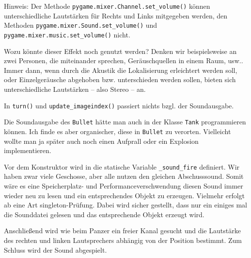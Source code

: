 Hinweis: Der Methode \texttt{pygame.mixer.Channel\-.set\-\_vol\-ume()} können unterschiedliche Lautstärken für Rechts und Links mitgegeben werden, den Methoden \texttt{pygame.mix\-er\-.Sound\-.set\-\_vol\-ume()} und \texttt{pygame.mixer.music\-.set\-\_vol\-ume()} nicht.


Wozu könnte dieser Effekt noch genutzt werden? Denken wir beispielsweise an zwei Personen, die miteinander sprechen, Geräuschquellen in einem Raum, usw.. Immer dann, wenn durch die Akustik die Lokalisierung erleichtert werden soll, oder Einzelgeräusche abgehoben bzw. unterschieden werden sollen, bieten sich unterschiedliche Lautstärken -- also Stereo -- an.

In \texttt{turn()} und \texttt{update\_imageindex()} passiert nichts bzgl. der Soundausgabe.


Die Soundausgabe des \texttt{Bullet} hätte man auch in der Klasse \texttt{Tank} programmieren können. Ich finde es aber organischer, diese in \texttt{Bullet} zu verorten. Vielleicht wollte man ja später auch noch einen Aufprall oder ein Explosion implementieren.

Vor dem Konstruktor wird in  die statische Variable \texttt{\_sound\_fire} definiert. Wir haben zwar viele Geschosse, aber alle nutzen den gleichen Abschusssound. Somit wäre es eine Speicherplatz- und Performanceverschwendung diesen Sound immer wieder neu zu lesen und ein entsprechendes Objekt zu erzeugen. Vielmehr erfolgt ab  eine Art \gls{singleton}-Prüfung. Dabei wird sicher gestellt, dass nur ein einiges mal die Sounddatei gelesen und das entsprechende Objekt erzeugt wird.

Anschließend wird wie beim Panzer ein freier Kanal gesucht und die Lautstärke des rechten und linken Lautsprechers abhängig von der Position bestimmt. Zum Schluss wird der Sound abgespielt.


